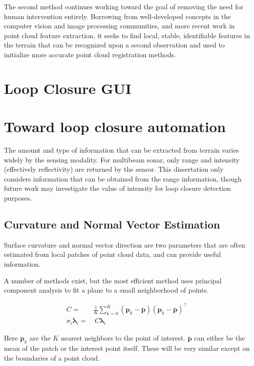 The second method continues working toward the goal of removing the need for human intervention entirely. Borrowing from well-developed concepts in the computer vision and image processing communities, and more recent work in point cloud feature extraction, it seeks to find local, stable, identifiable features in the terrain that can be recognized upon a second observation and used to initialize more accurate point cloud registration methods. 

\section{Loop Closure GUI}

\section{Toward loop closure automation}

The amount and type of information that can be extracted from terrain varies widely by the sensing modality. For multibeam sonar, only range and intensity (effectively reflectivity) are returned by the sensor. This dissertation only considers information that can be obtained from the range information, though future work may investigate the value of intensity for loop closure detection purposes.

\subsection{Curvature and Normal Vector Estimation}

Surface curvature and normal vector direction are two parameters that are often estimated from local patches of point cloud data, and can provide useful information. 

A number of methods exist, but the most efficient method uses principal component analysis to fit a plane to a small neighborhood of points. 

\begin{align} %
   C = ~&\frac{1}{K} \sum\limits_{k=0}^{K} (\mathbf{p}_k - \mathbf{\bar{p}})  (\mathbf{p}_k - \mathbf{\bar{p}})^\intercal \\
   \sigma_i\mathbf{\lambda}_i = &~ C\mathbf{\lambda}_i
\end{align}

Here $\mathbf{p}_k$ are the $K$ nearest neighbors to the point of interest. $\mathbf{\bar{p}}$ can either be the mean of the patch or the interest point itself. These will be very similar except on the boundaries of a point cloud.


